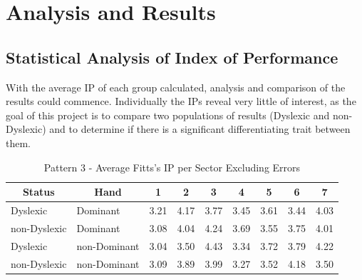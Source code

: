 \section{Analysis and Results}
	\subsection{Statistical Analysis of Index of Performance}
		With the average IP of each group calculated, analysis and comparison of the results could  commence. Individually the IPs reveal very little of interest, as the goal of this project is to compare two populations of results (Dyslexic and non-Dyslexic) and to determine if there is a significant differentiating trait between them.
		
	\begin{table}[h]
		\centering
		\caption{Pattern 3 - Average Fitts's IP per Sector Excluding Errors}
		\label{tab_pat_3_ip}
		\begin{tabularx}{\textwidth}{|l|l|X|X|X|X|X|X|X|}
			\hline
			\multicolumn{1}{|c|}{\textbf{Status}} & \multicolumn{1}{c|}{\textbf{Hand}} & \multicolumn{1}{c|}{\textbf{1}} & \multicolumn{1}{c|}{\textbf{2}} & \multicolumn{1}{c|}{\textbf{3}} & \multicolumn{1}{c|}{\textbf{4}} & \multicolumn{1}{c|}{\textbf{5}} & \multicolumn{1}{c|}{\textbf{6}} & \multicolumn{1}{c|}{\textbf{7}} \\ \hline
			Dyslexic                              & Dominant                           & 3.21       & 4.17       & 3.77       & 3.45       & 3.61       & 3.44       & 4.03       \\ \hline
			non-Dyslexic                          & Dominant                           & 3.08       & 4.04       & 4.24       & 3.69       & 3.55       & 3.75       & 4.01       \\ \hline
			Dyslexic                              & non-Dominant                       & 3.04       & 3.50       & 4.43       & 3.34       & 3.72       & 3.79       & 4.22       \\ \hline
			non-Dyslexic                          & non-Dominant                       & 3.09       & 3.89       & 3.99       & 3.27       & 3.52       & 4.18       & 3.50       \\ \hline
		\end{tabularx}
		\end{table}
		
